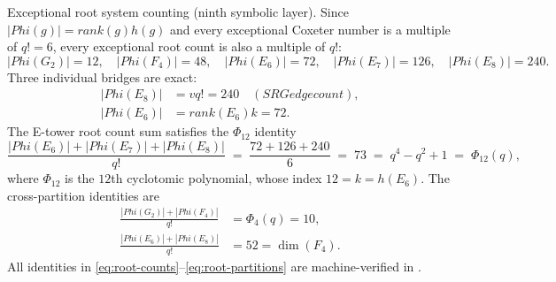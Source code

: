 \documentclass[12pt,a4paper]{article}
\def\mathrm#1{#1}%
\def\textbf#1{#1}%
\def\text#1{#1}%
\def\Phi#1{Phi#1}%
\def\cdot{ }%
\theoremstyle{definition}
\begin{document}
\medskip
\noindent\textbf{Exceptional root system counting (ninth symbolic layer).}\quad
Since $|\Phi(g)| = \mathrm{rank}(g)\cdot h(g)$ and every exceptional
Coxeter number is a multiple of $q!=6$, every exceptional root count is
also a multiple of $q!$:
\begin{equation}
|\Phi(G_2)|=12,\quad
|\Phi(F_4)|=48,\quad
|\Phi(E_6)|=72,\quad
|\Phi(E_7)|=126,\quad
|\Phi(E_8)|=240.
\label{eq:root-counts}
\end{equation}
Three individual bridges are exact:
\begin{equation}
\begin{aligned}
|\Phi(E_8)| &= v\cdot q! = 240\quad\text{(SRG edge count)},\\
|\Phi(E_6)| &= \mathrm{rank}(E_6)\cdot k = 72.
\end{aligned}
\label{eq:root-bridges}
\end{equation}
The E-tower root count sum satisfies the $\Phi_{12}$ identity
\begin{equation}
\frac{|\Phi(E_6)|+|\Phi(E_7)|+|\Phi(E_8)|}{q!}
    \;=\; \frac{72+126+240}{6}
    \;=\; 73
    \;=\; q^4-q^2+1
    \;=\; \Phi_{12}(q),
\label{eq:phi12-identity}
\end{equation}
where $\Phi_{12}$ is the $12$th cyclotomic polynomial, whose index
$12 = k = h(E_6)$.  The cross-partition identities are
\begin{equation}
\begin{aligned}
\frac{|\Phi(G_2)|+|\Phi(F_4)|}{q!} &= \Phi_4(q) = 10,\\
\frac{|\Phi(E_6)|+|\Phi(E_8)|}{q!} &= 52 = \dim(F_4).
\end{aligned}
\label{eq:root-partitions}
\end{equation}
All identities in \eqref{eq:root-counts}--\eqref{eq:root-partitions}
are machine-verified in
.
\end{document}
